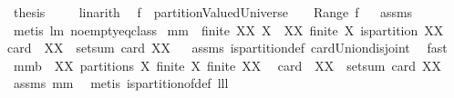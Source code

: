 \begin{isabellebody}
\ {\isacharquery}thesis\ \isamarkupfalse%
\ {}\ \isamarkupfalse%
\ linarith\isanewline
{}\isamarkupfalse%
%
\endisatagproof
{\isafoldproof}%
%
\isadelimproof
\isanewline
%
\endisadelimproof
\isanewline
{}\isamarkupfalse%
\ \ {\isachardoublequoteopen}f\ {\isasymin}\ partitionValuedUniverse{\isachardoublequoteclose}\ \ {\isachardoublequoteopen}{\isacharbraceleft}{\isacharbraceright}\ {\isasymnotin}\ Range\ f{\isachardoublequoteclose}%
\isadelimproof
\ %
\endisadelimproof
%
\isatagproof
{}\isamarkupfalse%
\ assms\ \isamarkupfalse%
\ {\isacharparenleft}metis\ lm{}{}\ no{\isacharunderscore}empty{\isacharunderscore}eq{\isacharunderscore}class{\isacharparenright}%
\endisatagproof
{\isafoldproof}%
%
\isadelimproof
%
\endisadelimproof
\isanewline
\isanewline
{}\isamarkupfalse%
\ mm{}{}{\isacharcolon}\ \ {\isachardoublequoteopen}finite\ XX{\isachardoublequoteclose}\ {\isachardoublequoteopen}{\isasymforall}X\ {\isasymin}\ XX{\isachardot}\ finite\ X{\isachardoublequoteclose}\ {\isachardoublequoteopen}is{\isacharunderscore}partition\ XX{\isachardoublequoteclose}\ \ \isanewline
{\isachardoublequoteopen}card\ {\isacharparenleft}{\isasymUnion}\ XX{\isacharparenright}\ {\isacharequal}\ setsum\ card\ XX{\isachardoublequoteclose}%
\isadelimproof
\ %
\endisadelimproof
%
\isatagproof
{}\isamarkupfalse%
\ assms\ is{\isacharunderscore}partition{\isacharunderscore}def\ card{\isacharunderscore}Union{\isacharunderscore}disjoint\ \isamarkupfalse%
\ fast%
\endisatagproof
{\isafoldproof}%
%
\isadelimproof
%
\endisadelimproof
\isanewline
\isanewline
{}\isamarkupfalse%
\ mm{}{}b{\isacharcolon}\ \ {\isachardoublequoteopen}XX\ partitions\ X{\isachardoublequoteclose}\ {\isachardoublequoteopen}finite\ X{\isachardoublequoteclose}\ {\isachardoublequoteopen}finite\ XX{\isachardoublequoteclose}\ \ \isanewline
{\isachardoublequoteopen}card\ {\isacharparenleft}{\isasymUnion}\ XX{\isacharparenright}\ {\isacharequal}\ setsum\ card\ XX{\isachardoublequoteclose}%
\isadelimproof
\ %
\endisadelimproof
%
\isatagproof
{}\isamarkupfalse%
\ assms\ mm{}{}\ \isamarkupfalse%
\ {\isacharparenleft}metis\ is{\isacharunderscore}partition{\isacharunderscore}of{\isacharunderscore}def\ lll{}{}{\isacharparenright}%

\end{isabellebody}
